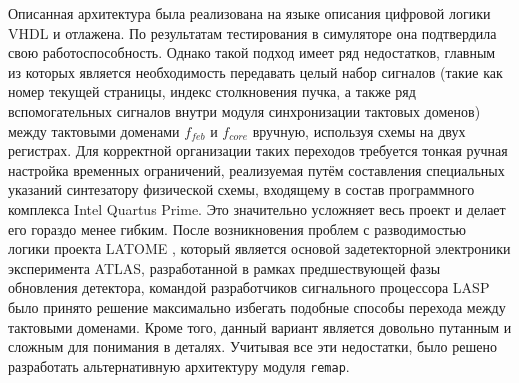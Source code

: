Описанная архитектура была реализована на языке описания цифровой логики VHDL и отлажена. По результатам тестирования в симуляторе она подтвердила свою работоспособность. Однако такой подход имеет ряд недостатков, главным из которых является необходимость передавать целый набор сигналов (такие как номер текущей страницы, индекс столкновения пучка, а также ряд вспомогательных сигналов внутри модуля синхронизации тактовых доменов) между тактовыми доменами $f_{feb}$ и $f_{core}$ вручную, используя схемы на двух регистрах. Для корректной организации таких переходов требуется тонкая ручная настройка временных ограничений, реализуемая путём составления специальных указаний синтезатору физической схемы, входящему в состав программного комплекса Intel Quartus Prime. Это значительно усложняет весь проект и делает его гораздо менее гибким. После возникновения проблем с разводимостью логики проекта LATOME \parencite{latome}, который является основой задетекторной электроники эксперимента ATLAS, разработанной в рамках предшествующей фазы обновления детектора, командой разработчиков сигнального процессора LASP было принято решение максимально избегать подобные способы перехода между тактовыми доменами. Кроме того, данный вариант является довольно путанным и сложным для понимания в деталях. Учитывая все эти недостатки, было решено разработать альтернативную архитектуру модуля \texttt{remap}.\par
